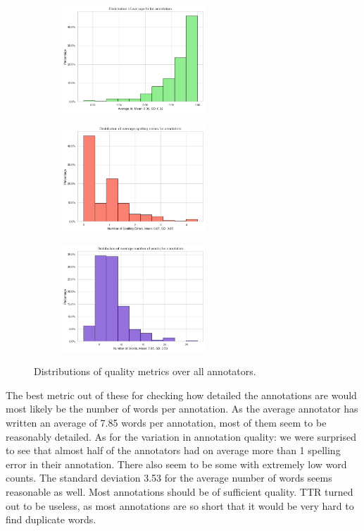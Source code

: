 \documentclass{article}
\begin{document}
\begin{figure}[htbp]
  \centering
  \begin{subfigure}[b]{0.33\textwidth}
    \includegraphics[width=\textwidth, height=4cm]{figs/ttr_dist.png}
  \end{subfigure}
  \hfill
  \begin{subfigure}[b]{0.33\textwidth}
    \includegraphics[width=\textwidth, height=4cm]{figs/error_dist.png}
  \end{subfigure}
  \hfill
  \begin{subfigure}[b]{0.33\textwidth}
    \includegraphics[width=\textwidth, height=4cm]{figs/word_dist.png}
  \end{subfigure}
  \caption{Distributions of quality metrics over all annotators.}
  \label{fig:2_d}
\end{figure}

The best metric out of these for checking how detailed the annotations are would most likely be the number of words per annotation. As the average annotator has written an average of 7.85 words per annotation, most of them seem to be reasonably detailed.
As for the variation in annotation quality: we were surprised to see that almost half of the annotators had on average more than 1 spelling error in their annotation. There also seem to be some with extremely low word counts. The standard deviation 3.53 for the average number of words seems reasonable as well. Most annotations should be of sufficient quality.
TTR turned out to be useless, as most annotations are so short that it would be very hard to find duplicate words.
\end{document}
